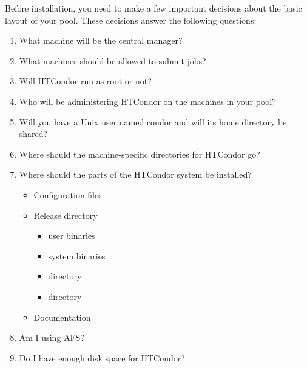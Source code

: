 Before installation, you need to make a few important
decisions about the basic layout of your pool.
These decisions answer the following questions:

\begin{enumerate}
\item What machine will be the central manager?
\item What machines should be allowed to submit jobs?
\item Will HTCondor run as root or not?
\item Who will be administering HTCondor on the machines in your pool?
\item Will you have a Unix user named condor and will its home directory be
   shared? 
\item Where should the machine-specific directories for HTCondor go?
\item Where should the parts of the HTCondor system be installed? 
	\begin{itemize}
	\item Configuration files
	\item Release directory
		\begin{itemize}
		\item user binaries
		\item system binaries 
		\item {} directory
	  	\item {} directory
		\end{itemize}
	\item Documentation
	\end{itemize}
\item Am I using AFS?
\item Do I have enough disk space for HTCondor?
\end{enumerate}

